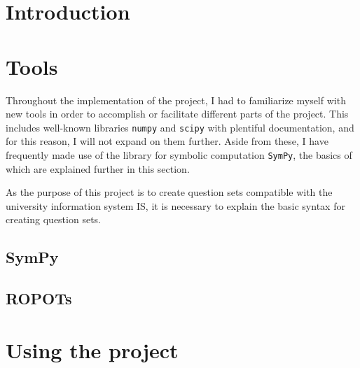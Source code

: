 \documentclass[
  digital, %
  table,   %
  twoside, %
  nolof,     %
  nolot,     %
  draft=false,
  final,
]{fithesis3}
\begin{document}
\chapter{Introduction}




\chapter{Tools}

Throughout the implementation of the project, I had to familiarize myself with new tools in order to accomplish or facilitate different parts of the project. This includes well-known libraries \verb|numpy| and \verb|scipy| with plentiful documentation, and for this reason, I will not expand on them further. Aside from these, I have frequently made use of the library for symbolic computation \verb|SymPy|, the basics of which are explained further in this section. 

As the purpose of this project is to create question sets compatible with the university information system IS, it is necessary to explain the basic syntax for creating question sets. 

\section{SymPy}



\section{ROPOTs}



\chapter{Using the project}
\end{document}
